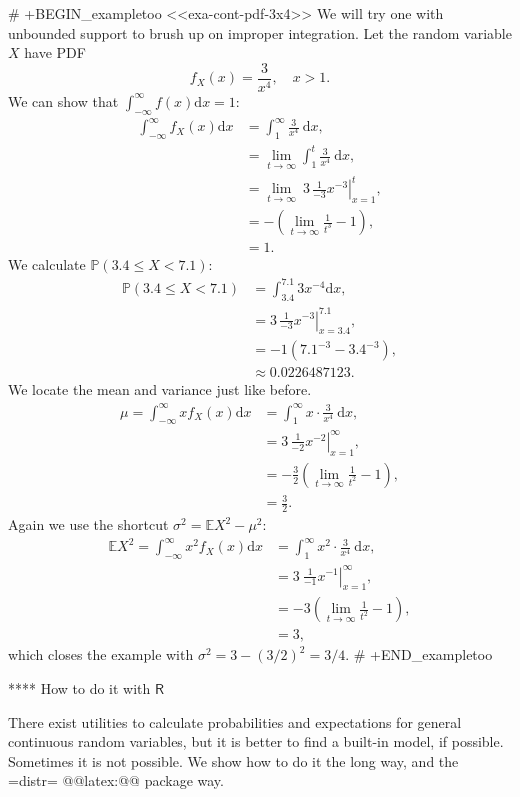 # +BEGIN_exampletoo
<<exa-cont-pdf-3x4>> We will try one with unbounded support to brush
up on improper integration. Let the random variable \(X\) have PDF \[
f_{X}(x)=\frac{3}{x^{4}},\quad x>1.  \] We can show that
\(\int_{-\infty}^{\infty}f(x)\mathrm{d} x=1\):
\begin{align*}
\int_{-\infty}^{\infty}f_{X}(x)\mathrm{d} x & =\int_{1}^{\infty}\frac{3}{x^{4}}\:\mathrm{d} x,\\
 & =\lim_{t\to\infty}\int_{1}^{t}\frac{3}{x^{4}}\:\mathrm{d} x,\\
 & =\lim_{t\to\infty}\ \left.3\,\frac{1}{-3}x^{-3}\right|_{x=1}^{t},\\
 & =-\left(\lim_{t\to\infty}\frac{1}{t^{3}}-1\right),\\
 & =1.
\end{align*}
We calculate \(\mathbb{P}(3.4\leq X<7.1)\):
\begin{align*}
\mathbb{P}(3.4\leq X<7.1) & =\int_{3.4}^{7.1}3x^{-4}\mathrm{d} x,\\
 & =\left.3\,\frac{1}{-3}x^{-3}\right|_{x=3.4}^{7.1},\\
 & =-1(7.1^{-3}-3.4^{-3}),\\
 & \approx0.0226487123.
\end{align*}
We locate the mean and variance just like before.
\begin{align*}
\mu=\int_{-\infty}^{\infty}xf_{X}(x)\mathrm{d} x & =\int_{1}^{\infty}x\cdot\frac{3}{x^{4}}\:\mathrm{d} x,\\
 & =\left.3\,\frac{1}{-2}x^{-2}\right|_{x=1}^{\infty},\\
 & =-\frac{3}{2}\left(\lim_{t\to\infty}\frac{1}{t^{2}}-1\right),\\
 & =\frac{3}{2}.
\end{align*}
Again we use the shortcut \(\sigma^{2}=\mathbb{E} X^{2}-\mu^{2}\):
\begin{align*}
\mathbb{E} X^{2}=\int_{-\infty}^{\infty}x^{2}f_{X}(x)\mathrm{d} x & =\int_{1}^{\infty}x^{2}\cdot\frac{3}{x^{4}}\:\mathrm{d} x,\\
 & =\left.3\:\frac{1}{-1}x^{-1}\right|_{x=1}^{\infty},\\
 & =-3\left(\lim_{t\to\infty}\frac{1}{t^{2}}-1\right),\\
 & =3,
\end{align*}
which closes the example with \(\sigma^{2}=3-(3/2)^{2}=3/4\).
# +END_exampletoo

**** How to do it with \(\mathsf{R}\)

There exist utilities to calculate probabilities and expectations for
general continuous random variables, but it is better to find a
built-in model, if possible. Sometimes it is not possible. We show how
to do it the long way, and the =distr= @@latex:@@ package \cite{distr} way.

